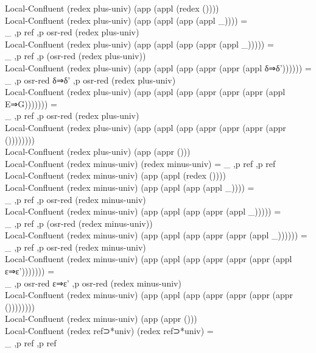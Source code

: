{\begin{code}
{\>Local-Confluent (redex plus-univ) (app (appl (redex ())))\<\\
\>Local-Confluent (redex plus-univ) (app (appl (app (appl \_)))) = \<\\
\>  \_ ,p ref ,p osr-red (redex plus-univ)\<\\
\>Local-Confluent (redex plus-univ) (app (appl (app (appr (appl \_))))) = \<\\
\>  \_ ,p ref ,p (osr-red (redex plus-univ))\<\\
\>Local-Confluent (redex plus-univ) (app (appl (app (appr (appr (appl δ⇒δ')))))) = \<\\
\>  \_ ,p osr-red δ⇒δ' ,p osr-red (redex plus-univ)\<\\
\>Local-Confluent (redex plus-univ) (app (appl (app (appr (appr (appr (appl E⇒G))))))) = \<\\
\>  \_ ,p ref ,p osr-red (redex plus-univ)\<\\
\>Local-Confluent (redex plus-univ) (app (appl (app (appr (appr (appr (appr ())))))))\<\\
\>Local-Confluent (redex plus-univ) (app (appr ()))\<\\
\>Local-Confluent (redex minus-univ) (redex minus-univ) = \_ ,p ref ,p ref\<\\
\>Local-Confluent (redex minus-univ) (app (appl (redex ())))\<\\
\>Local-Confluent (redex minus-univ) (app (appl (app (appl \_)))) = \<\\
\>  \_ ,p ref ,p osr-red (redex minus-univ)\<\\
\>Local-Confluent (redex minus-univ) (app (appl (app (appr (appl \_))))) = \<\\
\>  \_ ,p ref ,p (osr-red (redex minus-univ))\<\\
\>Local-Confluent (redex minus-univ) (app (appl (app (appr (appr (appl \_)))))) = \<\\
\>  \_ ,p ref ,p osr-red (redex minus-univ)\<\\
\>Local-Confluent (redex minus-univ) (app (appl (app (appr (appr (appr (appl ε⇒ε'))))))) = \<\\
\>  \_ ,p osr-red ε⇒ε' ,p osr-red (redex minus-univ)\<\\
\>Local-Confluent (redex minus-univ) (app (appl (app (appr (appr (appr (appr ())))))))\<\\
\>Local-Confluent (redex minus-univ) (app (appr ()))\<\\
\>Local-Confluent (redex ref⊃*univ) (redex ref⊃*univ) = \<\\
\>  \_ ,p ref ,p ref\<\\
}
\end{code}}
